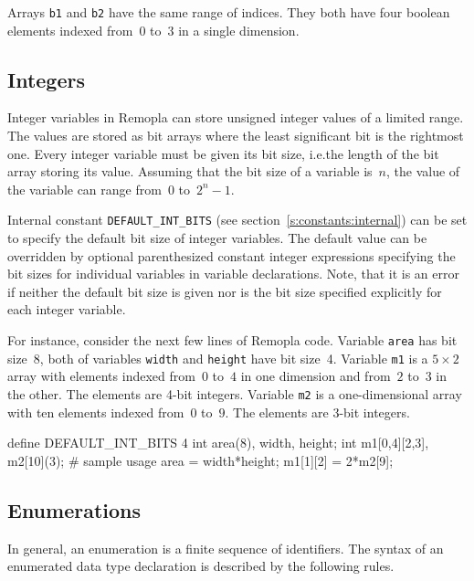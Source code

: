 \documentclass[a4paper,11pt,titlepage,english]{article}
\begin{document}
Arrays \verb|b1| and \verb|b2| have the same range of indices.
They both have four boolean elements indexed from~$0$ to~$3$
in a single dimension.

\subsection{Integers\label{s:data:int}}

Integer variables in Remopla can store unsigned integer values of a limited
range. The values are stored as bit arrays where the least significant
bit is the rightmost one. Every integer variable must be given its bit
size, i.e.\@ the length of the bit array storing its value. Assuming that
the bit size of a variable is~$n$, the value of the variable can range
from~$0$ to~$2^n-1$. 

Internal constant \verb|DEFAULT_INT_BITS| (see
section~\ref{s:constants:internal}) can be set to specify the default bit
size of integer variables. The default value can be overridden by optional
parenthesized constant integer expressions specifying the bit sizes for
individual variables in variable declarations. Note, that it is an error if
neither the default bit size is given nor is the bit size specified
explicitly for each integer variable.

For instance, consider the next few lines of Remopla code. Variable
\verb|area| has bit size~8, both of variables \verb|width| and
\verb|height| have bit size~4.  Variable \verb|m1| is a $5\times 2$ array
with elements indexed from~$0$ to~$4$ in one dimension and from~$2$ to~$3$
in the other.  The elements are 4-bit integers. Variable \verb|m2| is
a one-dimensional array with ten elements indexed from~$0$ to~$9$. The
elements are 3-bit integers.

\begin{RemoplaSnippet}
    define DEFAULT_INT_BITS 4
    int area(8), width, height;
    int m1[0,4][2,3], m2[10](3);
    # sample usage
    area = width*height;
    m1[1][2] = 2*m2[9];
\end{RemoplaSnippet}


\subsection{Enumerations\label{s:data:enum}}

In general, an enumeration is a finite sequence of identifiers. The syntax
of an enumerated data type declaration is described by the following rules.
\end{document}
